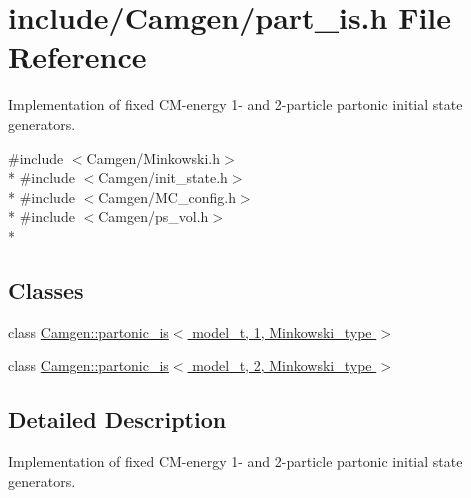 \hypertarget{a00711}{}\section{include/\+Camgen/part\+\_\+is.h File Reference}
\label{a00711}


Implementation of fixed C\+M-\/energy 1-\/ and 2-\/particle partonic initial state generators.  


{\ttfamily \#include $<$Camgen/\+Minkowski.\+h$>$}\\*
{\ttfamily \#include $<$Camgen/init\+\_\+state.\+h$>$}\\*
{\ttfamily \#include $<$Camgen/\+M\+C\+\_\+config.\+h$>$}\\*
{\ttfamily \#include $<$Camgen/ps\+\_\+vol.\+h$>$}\\*
\subsection*{Classes}
\begin{DoxyCompactItemize}
\item 
class \hyperlink{a00413}{Camgen\+::partonic\+\_\+is$<$ model\+\_\+t, 1, Minkowski\+\_\+type $>$}
\item 
class \hyperlink{a00414}{Camgen\+::partonic\+\_\+is$<$ model\+\_\+t, 2, Minkowski\+\_\+type $>$}
\end{DoxyCompactItemize}


\subsection{Detailed Description}
Implementation of fixed C\+M-\/energy 1-\/ and 2-\/particle partonic initial state generators. 

